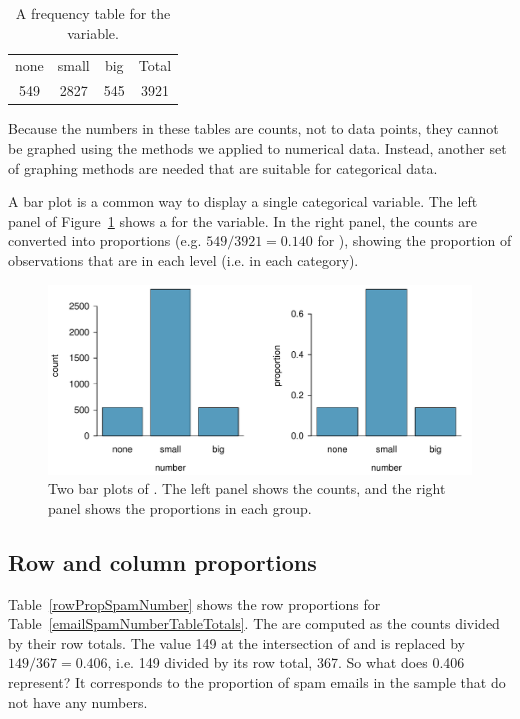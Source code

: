 \begin{table}[htb]
\centering
\begin{tabular}{cccc}
  \hline
none & small & big & Total \\
 549 & 2827 & 545 & 3921 \\
   \hline
\end{tabular}
\caption{A frequency table for the  variable.}
\label{emailNumberTable}
\end{table}

Because the numbers in these tables are counts, not to data points, they cannot be graphed using the methods we applied to numerical data. Instead, another set of graphing methods are needed that are suitable for categorical data.

A bar plot is a common way to display a single categorical variable. The left panel of Figure~\ref{emailNumberBarPlot} shows a  for the  variable. In the right panel, the counts are converted into proportions (e.g. $549/3921=0.140$ for ), showing the proportion of observations that are in each level (i.e. in each category).

\begin{figure}[bht]
   \centering
   \includegraphics[width=\textwidth]{ch_summarizing_data/figures/emailNumberBarPlot/emailNumberBarPlot}
   \caption{Two bar plots of . The left panel shows the counts, and the right panel shows the proportions in each group.}
   \label{emailNumberBarPlot}
\end{figure}


\subsection{Row and column proportions}

Table~\ref{rowPropSpamNumber} shows the row proportions for Table~\ref{emailSpamNumberTableTotals}. The  are computed as the counts divided by their row totals. The value 149 at the intersection of  and  is replaced by $149/367=0.406$, i.e. 149 divided by its row total, 367. So what does 0.406 represent? It corresponds to the proportion of spam emails in the sample that do not have any numbers.

